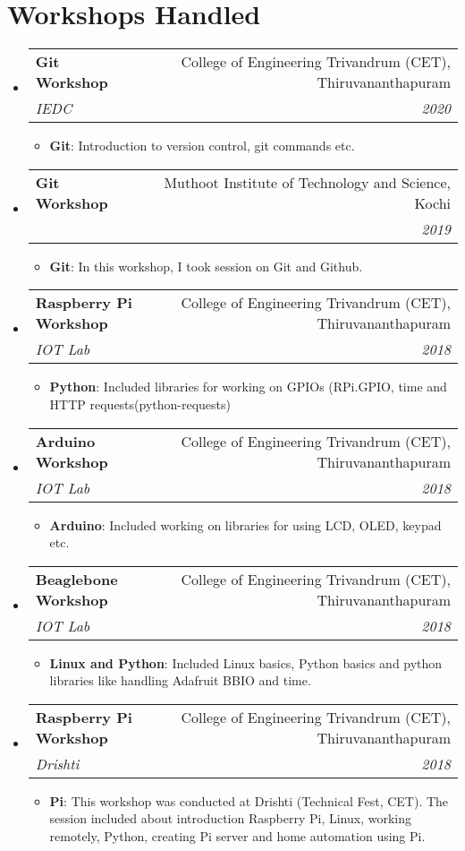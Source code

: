 \documentclass[letterpaper,11pt]{article}
\makeatletter
\newcommand{\resumeItem}[2]{
	\item\small{
    		\textbf{#1}{: #2 \vspace{-2pt}}
  	}
}
\newcommand{\resumeSubheading}[4]{
  	\vspace{-1pt}\item
    	\begin{tabular*}{0.97\textwidth}[t]{l@{\extracolsep{\fill}}r}
      		\textbf{#1} & #2 \\
      		\textit{\small#3} & \textit{\small #4} \\
    	\end{tabular*}\vspace{-5pt}
}
\newcommand{\resumeSubHeadingListStart}{\begin{itemize}[leftmargin=*]}
\newcommand{\resumeSubHeadingListEnd}{\end{itemize}}
\newcommand{\resumeItemListStart}{\begin{itemize}}
\newcommand{\resumeItemListEnd}{\end{itemize}\vspace{-5pt}}
\makeatother
\begin{document}
\section{Workshops Handled}
  	\resumeSubHeadingListStart
		\resumeSubheading
     			{Git Workshop}{College of Engineering Trivandrum (CET), Thiruvananthapuram}
      			{IEDC}{2020}
      			\resumeItemListStart
       				 \resumeItem{Git}
          				{Introduction to version control, git commands etc.}
      			\resumeItemListEnd
		\resumeSubheading
     			 {Git Workshop}{Muthoot Institute of Technology and Science, Kochi}
      			{}{2019}
     	 		\resumeItemListStart
        				\resumeItem{Git}
          				{In this workshop, I took session on Git and Github.}
      			\resumeItemListEnd
    		\resumeSubheading
     			{Raspberry Pi Workshop}{College of Engineering Trivandrum (CET), Thiruvananthapuram}
      			{IOT Lab}{2018}
      			\resumeItemListStart
       				 \resumeItem{Python}
          				{Included libraries for working on GPIOs (RPi.GPIO, time and HTTP requests(python-requests)}
      			\resumeItemListEnd
      		\resumeSubheading
      			{Arduino Workshop}{College of Engineering Trivandrum (CET), Thiruvananthapuram}
     			{IOT Lab}{2018}
      			\resumeItemListStart
        				\resumeItem{Arduino}
          				{Included working on libraries for using LCD, OLED, keypad etc.}
     	 		\resumeItemListEnd
      		\resumeSubheading
     		 	{Beaglebone Workshop}{College of Engineering Trivandrum (CET), Thiruvananthapuram}
      			{IOT Lab}{2018}
      			\resumeItemListStart
        				\resumeItem{Linux and Python}
          				{Included Linux basics, Python basics and python libraries like handling Adafruit BBIO and time.}
      			\resumeItemListEnd
      		\resumeSubheading
      			{Raspberry Pi Workshop}{College of Engineering Trivandrum (CET), Thiruvananthapuram}
     			{Drishti}{2018}
      			\resumeItemListStart
        				\resumeItem{Pi}
          				{This workshop was conducted at Drishti (Technical Fest, CET). The session included about introduction Raspberry Pi, Linux, working remotely, Python, creating Pi server and home automation using Pi.}
      			\resumeItemListEnd
 	 \resumeSubHeadingListEnd

\end{document}
